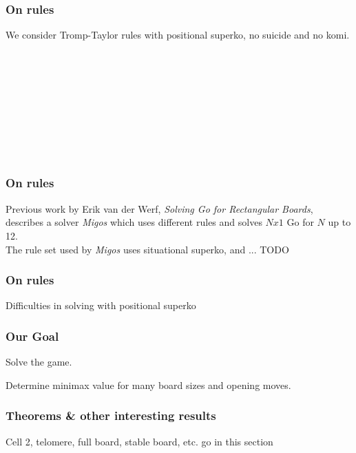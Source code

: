 \documentclass{beamer}
\begin{document}
    \begin{frame}
        \frametitle{On rules}
        We consider Tromp-Taylor rules with positional superko, no suicide and no komi.
        \bigskip
        \begin{center}
            \cleargoban
            \showgoban[b2,h2]\\\medskip
            \pause
            \showgoban[b2,h2]\\\medskip
            \pause
            \showgoban[b2,h2]\\\medskip
            \pause
            \showgoban[b2,h2]\\\medskip
            \pause
            \showgoban[b2,h2]\\\medskip
            \pause
            \showgoban[b2,h2]\\\medskip
            \pause
            \showgoban[b2,h2]\\\medskip
            \pause
            \showgoban[b2,h2]\\\medskip
        \end{center}
    \end{frame}

    \begin{frame}
        \frametitle{On rules}
        Previous work by Erik van der Werf, \textit{Solving Go for Rectangular Boards},
        describes a solver \textit{Migos} which uses different rules
        and solves $Nx1$ Go for $N$ up to 12.\\\medskip
        The rule set used by \textit{Migos} uses situational superko, and ... TODO
    \end{frame}

    \begin{frame}
        \frametitle{On rules}
        Difficulties in solving with positional superko
    \end{frame}

    \begin{frame}
        \frametitle{Our Goal}
        Solve the game.

        Determine minimax value for many board sizes and opening moves.
    \end{frame}


    \begin{frame}
        \frametitle{Theorems \& other interesting results}
        Cell 2, telomere, full board, stable board, etc. go in this section
    \end{frame}
\end{document}
